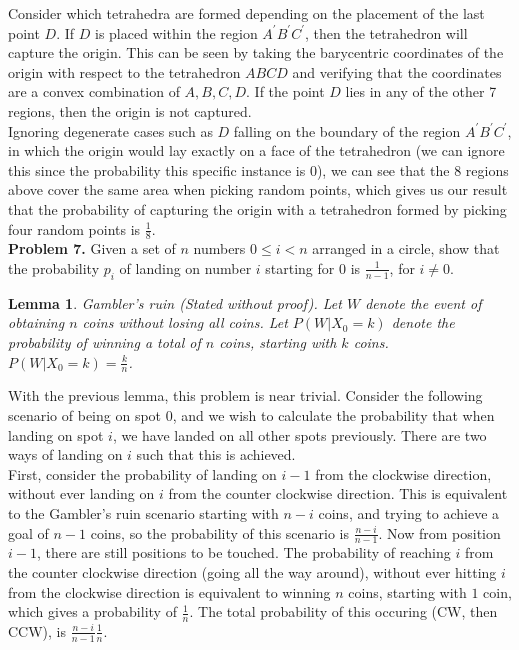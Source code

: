 \documentclass[a4paper]{article}
\newtheorem{lemma}[theorem]{Lemma}
\begin{document}
Consider which tetrahedra are formed depending on the placement of the last point $D$. If $D$ is placed within the region $A^\prime B^\prime C^\prime$, then the tetrahedron will capture the origin. This can be seen by taking the barycentric coordinates of the origin with respect to the tetrahedron $A B C D$ and verifying that the coordinates are a convex combination of $A, B, C, D$. If the point $D$ lies in any of the other 7 regions, then the origin is not captured. \\

Ignoring degenerate cases such as $D$ falling on the boundary of the region $A^\prime B^\prime C^\prime$, in which the origin would lay exactly on a face of the tetrahedron (we can ignore this since the probability this specific instance is 0), we can see that the 8 regions above cover the same area when picking random points, which gives us our result that the probability of capturing the origin with a tetrahedron formed by picking four random points is $\frac{1}{8}$. \\

\textbf{Problem 7.} Given a set of $n$ numbers $0 \leq i < n$ arranged in a circle, show that the probability $p_i$ of landing on number $i$ starting for $0$ is $\frac{1}{n-1}$, for $i \neq 0$.

\begin{lemma}
    Gambler's ruin (Stated without proof). Let $W$ denote the event of obtaining $n$ coins without losing all coins. Let $P(W | X_0 = k)$ denote the probability of winning a total of $n$ coins, starting with $k$ coins. $P(W | X_0 = k) = \frac{k}{n}$.
\end{lemma}

With the previous lemma, this problem is near trivial. Consider the following scenario of being on spot $0$, and we wish to calculate the probability that when landing on spot $i$, we have landed on all other spots previously. There are two ways of landing on $i$ such that this is achieved. \\

First, consider the probability of landing on $i-1$ from the clockwise direction, without ever landing on $i$ from the counter clockwise direction. This is equivalent to the Gambler's ruin scenario starting with $n-i$ coins, and trying to achieve a goal of $n-1$ coins, so the probability of this scenario is $\frac{n-i}{n-1}$. Now from position $i-1$, there are still positions to be touched. The probability of reaching $i$ from the counter clockwise direction (going all the way around), without ever hitting $i$ from the clockwise direction is equivalent to winning $n$ coins, starting with $1$ coin, which gives a probability of $\frac{1}{n}$. The total probability of this occuring (CW, then CCW), is $\frac{n-i}{n-1}\frac{1}{n}$. \\
\end{document}
